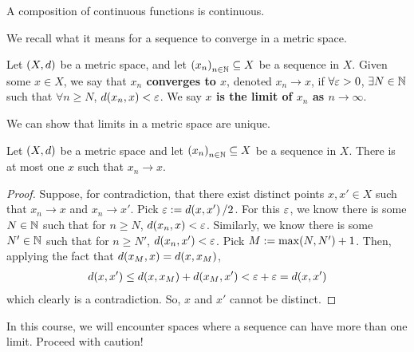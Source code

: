 \begin{boxexercise}
    A composition of continuous functions is continuous.
\end{boxexercise}



We recall what it means for a sequence to converge in a metric space.

\begin{boxdefinition}\label{Ch1:Def:Convergence_Metric}
    Let $\left( X, d \right)$ be a metric space, and let $\left( x_n \right)_{n \in \mathbb{N}} \subseteq X$ be a sequence in $X$. Given some $x \in X$, we say that \textbf{$x_n$ converges to $x$}, denoted $x_n \to x$, if $\forall \varepsilon > 0$, $\exists N \in \mathbb{N}$ such that $\forall n \geq N$, $d\!\left( x_n, x \right) < \varepsilon$. We say \textbf{$x$ is the limit of $x_n$ as $n \to \infty$}.
\end{boxdefinition}

We can show that limits in a metric space are unique.

\begin{boxproposition}\label{Ch1:Prop:Uniqueness_of_Limits_Metric}
    Let $\left( X, d \right)$ be a metric space and let $\left( x_n \right)_{n \in \mathbb{N}} \subseteq X$ be a sequence in $X$. There is at most one $x$ such that $x_n  \to x$.
\end{boxproposition}
\begin{proof}
    Suppose, for contradiction, that there exist distinct points $x, x' \in X$ such that $x_n \to x$ and $x_n \to x'$. Pick $\varepsilon := d\!\left( x, x' \right) / 2$. For this $\varepsilon$, we know there is some $N \in \mathbb{N}$ such that for $n \geq N$, $d\!\left( x_n, x \right) < \varepsilon$. Similarly, we know there is some $N' \in \mathbb{N}$ such that for $n \geq N'$, $d\!\left( x_n, x' \right) < \varepsilon$. Pick $M := \max\!\left( N, N' \right) + 1$. Then, applying the fact that $d\!\left( x_M, x \right) = d\!\left( x, x_M \right)$,
    \begin{align*}
        d\!\left( x, x' \right) \leq d\!\left( x, x_M \right) + d\!\left( x_M, x' \right) < \varepsilon + \varepsilon = d\!\left( x, x' \right)
    \end{align*}
    which clearly is a contradiction. So, $x$ and $x'$ cannot be distinct.
\end{proof}

\begin{boxwarning}
    In this course, we will encounter spaces where a sequence can have more than one limit. Proceed with caution!
\end{boxwarning}

